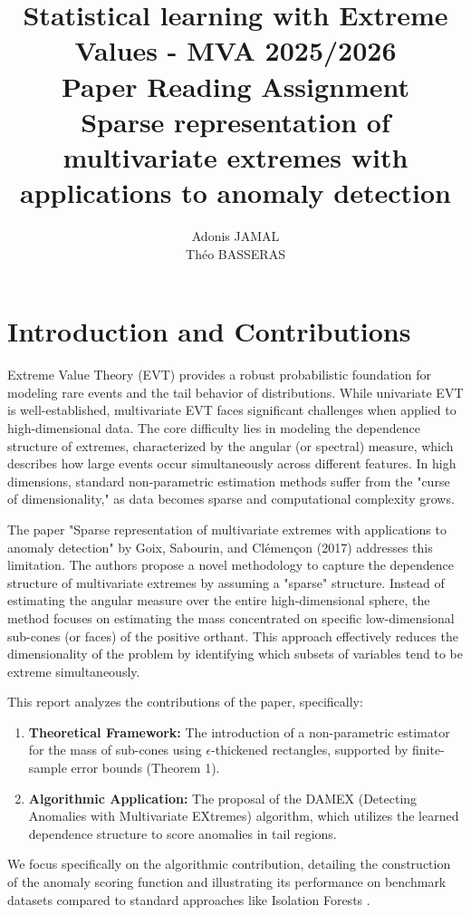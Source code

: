\documentclass[11pt]{article}
\title{Statistical learning with Extreme Values - MVA 2025/2026
      \\ \Large{Paper Reading Assignment}
      \\ \Large{Sparse representation of multivariate extremes with applications to anomaly detection}}
\author{
Adonis JAMAL \email{adonis.jamal@student-cs.fr} \\ %
Théo BASSERAS \email{theobasseras@gmail.com} %
}
\begin{document}
\maketitle
\section{Introduction and Contributions}
Extreme Value Theory (EVT) provides a robust probabilistic foundation for modeling rare events and the tail behavior of distributions. While univariate EVT is well-established, multivariate EVT faces significant challenges when applied to high-dimensional data. The core difficulty lies in modeling the dependence structure of extremes, characterized by the angular (or spectral) measure, which describes how large events occur simultaneously across different features. In high dimensions, standard non-parametric estimation methods suffer from the "curse of dimensionality," as data becomes sparse and computational complexity grows.

The paper "Sparse representation of multivariate extremes with applications to anomaly detection" by Goix, Sabourin, and Clémençon (2017) \cite{GOIX201712} addresses this limitation. The authors propose a novel methodology to capture the dependence structure of multivariate extremes by assuming a "sparse" structure. Instead of estimating the angular measure over the entire high-dimensional sphere, the method focuses on estimating the mass concentrated on specific low-dimensional sub-cones (or faces) of the positive orthant. This approach effectively reduces the dimensionality of the problem by identifying which subsets of variables tend to be extreme simultaneously.

This report analyzes the contributions of the paper, specifically:
\begin{enumerate}
  \item \textbf{Theoretical Framework:} The introduction of a non-parametric estimator for the mass of sub-cones using $\epsilon$-thickened rectangles, supported by finite-sample error bounds (Theorem 1).
  \item \textbf{Algorithmic Application:} The proposal of the DAMEX (Detecting Anomalies with Multivariate EXtremes) algorithm, which utilizes the learned dependence structure to score anomalies in tail regions.
\end{enumerate}

We focus specifically on the algorithmic contribution, detailing the construction of the anomaly scoring function and illustrating its performance on benchmark datasets compared to standard approaches like Isolation Forests \cite{iForestLiu2009}.
\end{document}
